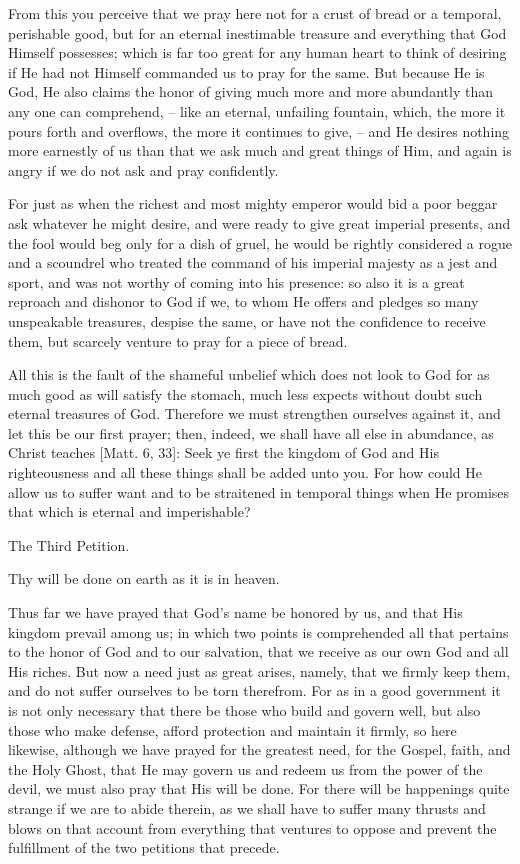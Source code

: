 From this you perceive that we pray here not for a crust of bread or a
temporal, perishable good, but for an eternal inestimable treasure and
everything that God Himself possesses; which is far too great for any
human heart to think of desiring if He had not Himself commanded us to
pray for the same. But because He is God, He also claims the honor of
giving much more and more abundantly than any one can comprehend, --
like an eternal, unfailing fountain, which, the more it pours forth and
overflows, the more it continues to give, -- and He desires nothing
more earnestly of us than that we ask much and great things of Him, and
again is angry if we do not ask and pray confidently.

For just as when the richest and most mighty emperor would bid a poor
beggar ask whatever he might desire, and were ready to give great
imperial presents, and the fool would beg only for a dish of gruel, he
would be rightly considered a rogue and a scoundrel who treated the
command of his imperial majesty as a jest and sport, and was not worthy
of coming into his presence: so also it is a great reproach and
dishonor to God if we, to whom He offers and pledges so many
unspeakable treasures, despise the same, or have not the confidence to
receive them, but scarcely venture to pray for a piece of bread.

All this is the fault of the shameful unbelief which does not look to
God for as much good as will satisfy the stomach, much less expects
without doubt such eternal treasures of God. Therefore we must
strengthen ourselves against it, and let this be our first prayer;
then, indeed, we shall have all else in abundance, as Christ teaches
[Matt. 6, 33]: Seek ye first the kingdom of God and His righteousness
and all these things shall be added unto you. For how could He allow us
to suffer want and to be straitened in temporal things when He promises
that which is eternal and imperishable?

 The Third Petition.

Thy will be done on earth as it is in heaven.

Thus far we have prayed that God's name be honored by us, and that His
kingdom prevail among us; in which two points is comprehended all that
pertains to the honor of God and to our salvation, that we receive as
our own God and all His riches. But now a need just as great arises,
namely, that we firmly keep them, and do not suffer ourselves to be
torn therefrom. For as in a good government it is not only necessary
that there be those who build and govern well, but also those who make
defense, afford protection and maintain it firmly, so here likewise,
although we have prayed for the greatest need, for the Gospel, faith,
and the Holy Ghost, that He may govern us and redeem us from the power
of the devil, we must also pray that His will be done. For there will
be happenings quite strange if we are to abide therein, as we shall
have to suffer many thrusts and blows on that account from everything
that ventures to oppose and prevent the fulfillment of the two
petitions that precede.

